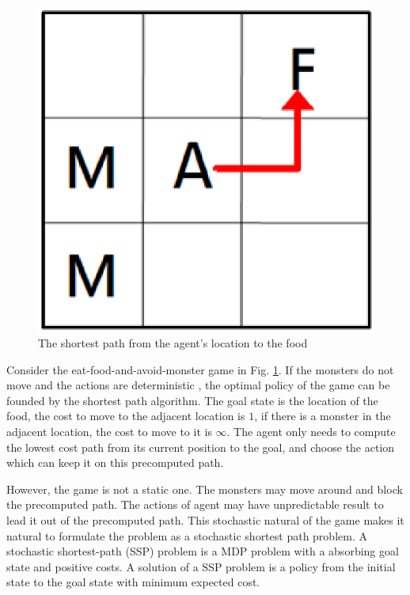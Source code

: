 
\begin{figure}[h]
    \centering
    \begin{minipage}[t]{0.3\linewidth}
        \centering
        \includegraphics[width=\textwidth] {./figures/monster_plan.eps}
    \end{minipage}
    \caption{The shortest path from the agent's location to the food}
    \label{fig:monster_plan}
\end{figure}
Consider the eat-food-and-avoid-monster game in Fig. \ref{fig:monster_plan}. If the monsters do not move and the actions are deterministic
, the optimal policy of the game can be founded by the shortest path algorithm. The goal state is the location of the food,
the cost to move to the adjacent location is $1$, if there is a monster in the adjacent location, the cost 
to move to it is $\infty$. The agent only needs to compute the lowest cost path from its current position to the goal,
and choose the action which can keep it on this precomputed path.

However, the game is not a static one. The monsters may move around and block the precomputed path. The actions of
agent may have unpredictable result to lead it out of the precomputed path.
This stochastic natural of the game makes it natural to formulate the problem as a stochastic shortest path
problem. A stochastic shortest-path (SSP) problem is a MDP problem with a absorbing goal state and positive costs.
A solution of a SSP problem is a policy from the initial state to the goal state with minimum expected cost.

